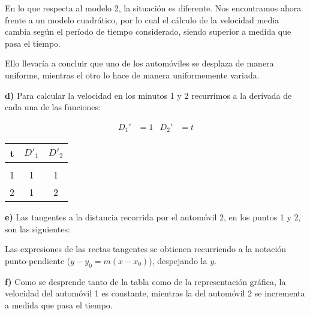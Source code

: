 En lo que respecta al modelo 2, la situación es diferente. Nos encontramos ahora frente a un modelo cuadrático, por lo cual el cálculo de la velocidad media cambia según el período de tiempo considerado, siendo superior a medida que pasa el tiempo. 

Ello llevaría a concluir que uno de los automóviles se desplaza de manera uniforme, mientras el otro lo hace de manera uniformemente variada.

\vspace{10pt}

\textbf{d)} Para calcular la velocidad en los minutos 1 y 2 recurrimos a la derivada de cada una de las funciones:

\begin{align*}
    D_1' &= 1 &
    D_2' &= t
\end{align*}

\begin{center}
\begin{tabular}{ c c c }
	t	&	$D'_1$  &   $D'_2$  \\
	\hline \\
	1	&	1     &   1\\	
	2	&	1     &   2\\
    \hline
\end{tabular}
\end{center}

\textbf{e)} Las tangentes a la distancia recorrida por el automóvil 2, en los puntos 1 y 2, son las siguientes:

\begin{center}
\end{center}

Las expresiones de las rectas tangentes se obtienen recurriendo a la notación punto-pendiente ($y-y_0 = m(x-x_0)$), despejando la $y$.

\vspace{10pt}

\textbf{f)} Como se desprende tanto de la tabla como de la representación gráfica, la velocidad del automóvil 1 es constante, mientras la del automóvil 2 se incrementa a medida que pasa el tiempo.

